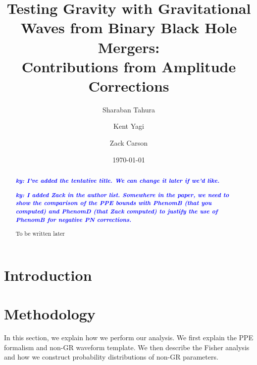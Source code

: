 \documentclass[prd,twocolumn,nofootinbib]{revtex4-1}
\newcommand{\ky}[1]{\textcolor{blue}{\it{\textbf{ky: #1}}} }
\begin{document}
\title{Testing Gravity with Gravitational Waves from Binary Black Hole Mergers: \\ Contributions from Amplitude Corrections}

\author{Sharaban Tahura}

\author{Kent Yagi}

\author{Zack Carson}

\begin{abstract}

\ky{I've added the tentative title. We can change it later if we'd like.}

\ky{I added Zack in the author list. Somewhere in the paper, we need to show the comparison of the PPE bounds with PhenomB (that you computed) and PhenomD (that Zack computed) to justify the use of PhenomB for negative PN corrections.}

To be written later
\end{abstract}

\date{\today}




\maketitle




\section{Introduction}

\section{Methodology}\label{section:method}

In this section, we explain how we perform our analysis. We first explain the PPE formalism and non-GR waveform template. We then describe the Fisher analysis and how we construct probability distributions of non-GR parameters.

\end{document}
